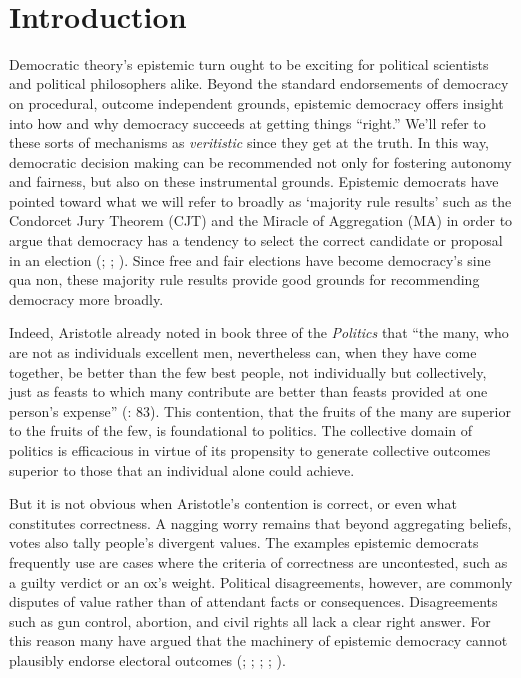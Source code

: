 \documentclass[11pt]{article}
\begin{document}
\ \\
\section{Introduction}
Democratic theory's epistemic turn ought to be exciting for political scientists and political philosophers alike. Beyond the standard endorsements of democracy on procedural, outcome independent grounds, epistemic democracy offers insight into how and why democracy succeeds at getting things ``right.'' We'll refer to these sorts of mechanisms as \emph{veritistic} since they get at the truth. In this way, democratic decision making can be recommended not only for fostering autonomy and fairness, but also on these instrumental grounds. Epistemic democrats have pointed toward what we will refer to broadly as `majority rule results' such as the Condorcet Jury Theorem (CJT) and the Miracle of Aggregation (MA) in order to argue that democracy has a tendency to select the correct candidate or proposal in an election (\citet{Landemore13}; \cite{Surowiecki2004}; \cite{List2001}). Since free and fair elections have become democracy's sine qua non, these majority rule results provide good grounds for recommending democracy more broadly.

Indeed, Aristotle already noted in book three of the \emph{Politics} that ``the many, who are not as individuals excellent men, nevertheless can, when they have come together, be better than the few best people, not individually but collectively, just as feasts to which many contribute are better than feasts provided at one person's expense'' (\cite{reeve1998aristotle}: 83). This contention, that the fruits of the many are superior to the fruits of the few, is foundational to politics. The collective domain of politics is efficacious in virtue of its propensity to generate collective outcomes superior to those that an individual alone could achieve.

But it is not obvious when Aristotle's contention is correct, or even what constitutes correctness. A nagging worry remains that beyond aggregating beliefs, votes also tally people's divergent values. The examples epistemic democrats frequently use are cases where the criteria of correctness are uncontested, such as a guilty verdict or an ox's weight. Political disagreements, however, are commonly  disputes of value rather than of attendant facts or consequences. Disagreements such as gun control, abortion, and civil rights all lack a clear right answer. %
  For this reason many have argued that the machinery of epistemic democracy cannot plausibly endorse electoral outcomes (\citet{Anderson2006}; \citet{Estlund1997}; \citet{Estlund08}; \citet{Ingham2013}; \cite{urbinati2014democracy}).
\end{document}

